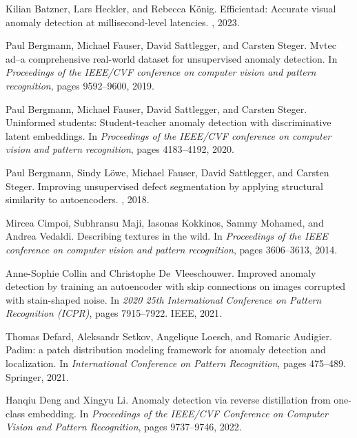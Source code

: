 \documentclass[5p, twocolumn]{elsarticle}[draft]
\begin{document}
\begin{thebibliography}{10}

Kilian Batzner, Lars Heckler, and Rebecca K{\"o}nig.
\newblock Efficientad: Accurate visual anomaly detection at millisecond-level latencies.
, 2023.

Paul Bergmann, Michael Fauser, David Sattlegger, and Carsten Steger.
\newblock Mvtec ad--a comprehensive real-world dataset for unsupervised anomaly detection.
\newblock In {\em Proceedings of the IEEE/CVF conference on computer vision and pattern recognition}, pages 9592--9600, 2019.

Paul Bergmann, Michael Fauser, David Sattlegger, and Carsten Steger.
\newblock Uninformed students: Student-teacher anomaly detection with discriminative latent embeddings.
\newblock In {\em Proceedings of the IEEE/CVF conference on computer vision and pattern recognition}, pages 4183--4192, 2020.

Paul Bergmann, Sindy L{\"o}we, Michael Fauser, David Sattlegger, and Carsten Steger.
\newblock Improving unsupervised defect segmentation by applying structural similarity to autoencoders.
, 2018.

Mircea Cimpoi, Subhransu Maji, Iasonas Kokkinos, Sammy Mohamed, and Andrea Vedaldi.
\newblock Describing textures in the wild.
\newblock In {\em Proceedings of the IEEE conference on computer vision and pattern recognition}, pages 3606--3613, 2014.

Anne-Sophie Collin and Christophe De~Vleeschouwer.
\newblock Improved anomaly detection by training an autoencoder with skip connections on images corrupted with stain-shaped noise.
\newblock In {\em 2020 25th International Conference on Pattern Recognition (ICPR)}, pages 7915--7922. IEEE, 2021.

Thomas Defard, Aleksandr Setkov, Angelique Loesch, and Romaric Audigier.
\newblock Padim: a patch distribution modeling framework for anomaly detection and localization.
\newblock In {\em International Conference on Pattern Recognition}, pages 475--489. Springer, 2021.

Hanqiu Deng and Xingyu Li.
\newblock Anomaly detection via reverse distillation from one-class embedding.
\newblock In {\em Proceedings of the IEEE/CVF Conference on Computer Vision and Pattern Recognition}, pages 9737--9746, 2022.


\end{thebibliography}
\end{document}
